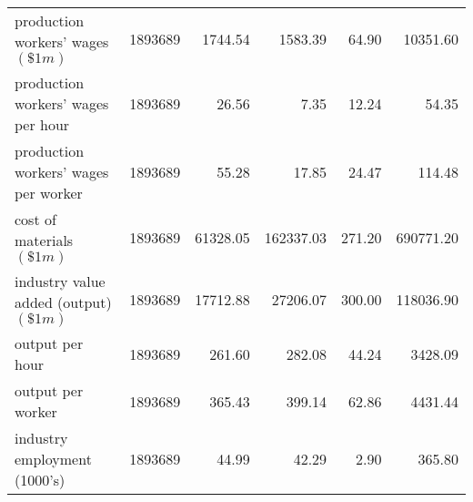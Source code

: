 \begin{table}[H]
{\begin{tabular}{lrrrrr}
            production workers' wages $(\$1m)$                      & 1893689 & 1744.54   & 1583.39    & 64.90   & 10351.60   \\
            production workers' wages per hour                      & 1893689 & 26.56     & 7.35       & 12.24   & 54.35      \\
            production workers' wages per worker                    & 1893689 & 55.28     & 17.85      & 24.47   & 114.48     \\
            cost of materials $(\$1m)$                              & 1893689 & 61328.05  & 162337.03  & 271.20  & 690771.20  \\
            industry value added (output) $(\$1m)$                  & 1893689 & 17712.88  & 27206.07   & 300.00  & 118036.90  \\
            output per hour                                         & 1893689 & 261.60    & 282.08     & 44.24   & 3428.09    \\
            output per worker                                       & 1893689 & 365.43    & 399.14     & 62.86   & 4431.44    \\
            industry employment (1000's)                            & 1893689 & 44.99     & 42.29      & 2.90    & 365.80     \\ \bottomrule\bottomrule
        \end{tabular}
    }
\end{table}
